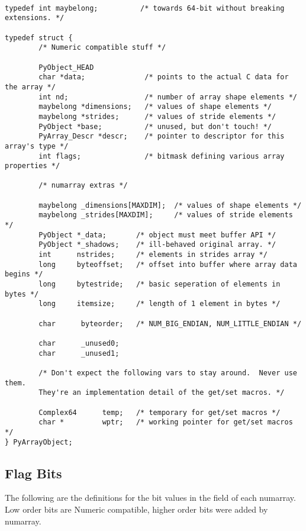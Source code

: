 \begin{verbatim}

typedef int maybelong;          /* towards 64-bit without breaking extensions. */

typedef struct {
        /* Numeric compatible stuff */

        PyObject_HEAD
        char *data;              /* points to the actual C data for the array */
        int nd;                  /* number of array shape elements */
        maybelong *dimensions;   /* values of shape elements */
        maybelong *strides;      /* values of stride elements */
        PyObject *base;          /* unused, but don't touch! */
        PyArray_Descr *descr;    /* pointer to descriptor for this array's type */
        int flags;               /* bitmask defining various array properties */

        /* numarray extras */

        maybelong _dimensions[MAXDIM];  /* values of shape elements */
        maybelong _strides[MAXDIM];     /* values of stride elements */
        PyObject *_data;       /* object must meet buffer API */
        PyObject *_shadows;    /* ill-behaved original array. */
        int      nstrides;     /* elements in strides array */
        long     byteoffset;   /* offset into buffer where array data begins */
        long     bytestride;   /* basic seperation of elements in bytes */
        long     itemsize;     /* length of 1 element in bytes */

        char      byteorder;   /* NUM_BIG_ENDIAN, NUM_LITTLE_ENDIAN */

        char      _unused0; 
        char      _unused1; 
        
        /* Don't expect the following vars to stay around.  Never use them.
        They're an implementation detail of the get/set macros. */

        Complex64      temp;   /* temporary for get/set macros */
        char *         wptr;   /* working pointer for get/set macros */
} PyArrayObject;

\end{verbatim}

\subsection{Flag Bits}

The following are the definitions for the bit values in the  field
of each numarray.  Low order bits are Numeric compatible,  higher order bits
were added by numarray.

